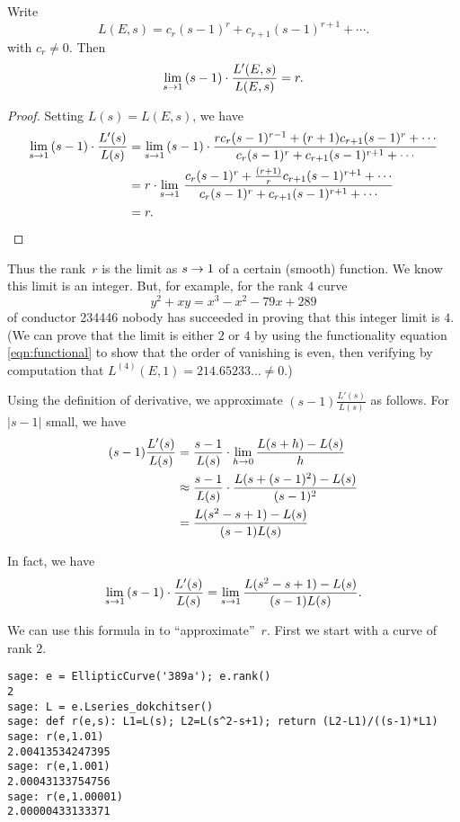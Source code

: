 \begin{proposition}
Write 
$$
   L(E,s) = c_r(s-1)^r + c_{r+1}(s-1)^{r+1} + \cdots.
$$
with $c_r\neq 0$.  Then 
$$ 
  \lim_{s\rightarrow 1}\,
   (s-1)\cdot \frac{L'(E,s)}{L(E,s)} = r.
$$
\end{proposition}
\begin{proof}
Setting $L(s) = L(E,s)$, we have
\begin{align*}
 \lim_{s\rightarrow 1} \, 
  (s-1)\cdot \frac{L'(s)}{L(s)}
   &=  \lim_{s\rightarrow 1} \,
         (s-1)\cdot \frac{r c_r (s-1)^{r-1} + (r+1) c_{r+1}(s-1)^r + \cdots}
          {c_r(s-1)^r + c_{r+1}(s-1)^{r+1} + \cdots}\\
   &=  r\cdot \lim_{s\rightarrow 1} \,
          \frac{c_r (s-1)^{r} + \frac{(r+1)}{r} c_{r+1}(s-1)^{r+1} + \cdots}
          {c_r(s-1)^r + c_{r+1}(s-1)^{r+1} + \cdots}\\
   &= r.
\end{align*}
\end{proof}

Thus the rank~$r$ is 
the limit as $s\rightarrow 1$ of a certain (smooth) function.  We know this
limit is an integer.  But, for example, for the rank $4$ curve 
\begin{equation}\label{eqn:rank4}
  y^2 +xy = x^3 - x^2 - 79x + 289
\end{equation}
of conductor 234446
nobody has succeeded in proving that this integer limit is $4$.  (We
can prove that the limit is either $2$ or $4$ by using 
the functionality equation \eqref{eqn:functional} to show that
the order of vanishing is even, then verifying by computation
that $L^{(4)}(E,1)= 214.65233\ldots \neq 0$.)

Using the definition of derivative, we approximate 
$(s-1)\frac{L'(s)}{L(s)}$ as follows.  For $|s-1|$ small, we have
\begin{align*}
(s-1)\frac{L'(s)}{L(s)} &= 
    \frac{s-1}{L(s)}\cdot \lim_{h\rightarrow 0}  \frac{L(s+h) - L(s)}{h}\\
    &\approx \frac{s-1}{L(s)}\cdot
             \frac{L(s+(s-1)^2) - L(s)}{(s-1)^2}\\
    &= \frac{L(s^2 - s+1) - L(s)}{(s-1)L(s)}
\end{align*}

In fact, we have
$$
  \lim_{s\rightarrow 1}\, (s-1)\cdot \frac{L'(s)}{L(s)} 
        = \lim_{s\rightarrow 1} \frac{L(s^2 - s+1) - L(s)}{(s-1)L(s)}.
$$

We can use this formula in \sage to 
``approximate''~$r$.  First we start
with a curve of rank $2$.
\begin{verbatim}
sage: e = EllipticCurve('389a'); e.rank()
2
sage: L = e.Lseries_dokchitser()
sage: def r(e,s): L1=L(s); L2=L(s^2-s+1); return (L2-L1)/((s-1)*L1)
sage: r(e,1.01)
2.00413534247395
sage: r(e,1.001)
2.00043133754756
sage: r(e,1.00001)
2.00000433133371
\end{verbatim}

